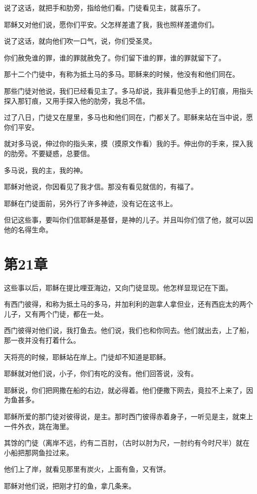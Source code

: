 \documentclass[12pt,oneside]{book}
\begin{document}
说了这话，就把手和肋旁，指给他们看。门徒看见主，就喜乐了。

耶稣又对他们说，愿你们平安。父怎样差遣了我，我也照样差遣你们。

说了这话，就向他们吹一口气，说，你们受圣灵。

你们赦免谁的罪，谁的罪就赦免了。你们留下谁的罪，谁的罪就留下了。

那十二个门徒中，有称为抵土马的多马。耶稣来的时候，他没有和他们同在。

那些门徒对他说，我们已经看见主了。多马却说，我非看见他手上的钉痕，用指头探入那钉痕，又用手探入他的肋旁，我总不信。

过了八日，门徒又在屋里，多马也和他们同在，门都关了。耶稣来站在当中说，愿你们平安。

就对多马说，伸过你的指头来，摸（摸原文作看）我的手。伸出你的手来，探入我的肋旁。不要疑惑，总要信。

多马说，我的主，我的神。

耶稣对他说，你因看见了我才信。那没有看见就信的，有福了。

耶稣在门徒面前，另外行了许多神迹，没有记在这书上。

但记这些事，要叫你们信耶稣是基督，是神的儿子。并且叫你们信了他，就可以因他的名得生命。

\chapter{第21章}
这些事以后，耶稣在提比哩亚海边，又向门徒显现。他怎样显现记在下面。

有西门彼得，和称为抵土马的多马，并加利利的迦拿人拿但业，还有西庇太的两个儿子，又有两个门徒，都在一处。

西门彼得对他们说，我打鱼去。他们说，我们也和你同去。他们就出去，上了船，那一夜并没有打着什么。

天将亮的时候，耶稣站在岸上。门徒却不知道是耶稣。

耶稣就对他们说，小子，你们有吃的没有。他们回答说，没有。

耶稣说，你们把网撒在船的右边，就必得着。他们便撒下网去，竟拉不上来了，因为鱼甚多。

耶稣所爱的那门徒对彼得说，是主。那时西门彼得赤着身子，一听见是主，就束上一件外衣，跳在海里。

其馀的门徒（离岸不远，约有二百肘，（古时以肘为尺，一肘约有今时尺半）就在小船把那网鱼拉过来。

他们上了岸，就看见那里有炭火，上面有鱼，又有饼。

耶稣对他们说，把刚才打的鱼，拿几条来。
\end{document}
